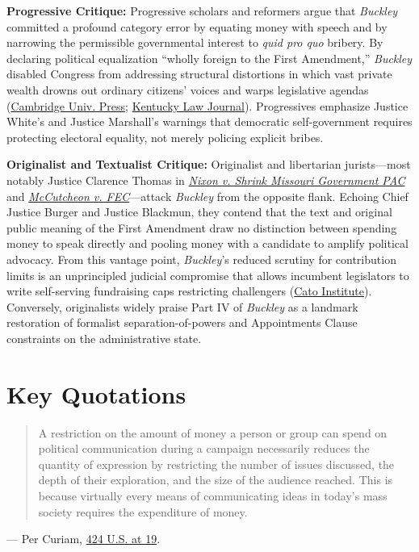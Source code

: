 \documentclass[12pt]{article}
\begin{document}
\textbf{Progressive Critique:} Progressive scholars and reformers argue that \textit{Buckley} committed a profound category error by equating money with speech and by narrowing the permissible governmental interest to \textit{quid pro quo} bribery. By declaring political equalization ``wholly foreign to the First Amendment,'' \textit{Buckley} disabled Congress from addressing structural distortions in which vast private wealth drowns out ordinary citizens' voices and warps legislative agendas (\href{https://www.cambridge.org/core/books/law-of-freedom/campaign-finance/67D70830F386B05225DCEF7D8D8C25C7}{Cambridge Univ. Press}; \href{https://uknowledge.uky.edu/cgi/viewcontent.cgi?article=5550&context=klj}{Kentucky Law Journal}). Progressives emphasize Justice White's and Justice Marshall's warnings that democratic self-government requires protecting electoral equality, not merely policing explicit bribes.

\textbf{Originalist and Textualist Critique:} Originalist and libertarian jurists---most notably Justice Clarence Thomas in \href{https://www.oyez.org/cases/1999/98-963}{\textit{Nixon v. Shrink Missouri Government PAC}} and \href{https://www.oyez.org/cases/2013/12-536}{\textit{McCutcheon v. FEC}}---attack \textit{Buckley} from the opposite flank. Echoing Chief Justice Burger and Justice Blackmun, they contend that the text and original public meaning of the First Amendment draw no distinction between spending money to speak directly and pooling money with a candidate to amplify political advocacy. From this vantage point, \textit{Buckley}'s reduced scrutiny for contribution limits is an unprincipled judicial compromise that allows incumbent legislators to write self-serving fundraising caps restricting challengers (\href{https://www.cato.org/commentary/buckley-v-valeo-not-what-ails-american-democracy}{Cato Institute}). Conversely, originalists widely praise Part IV of \textit{Buckley} as a landmark restoration of formalist separation-of-powers and Appointments Clause constraints on the administrative state.

\section{Key Quotations}

\begin{quote}
A restriction on the amount of money a person or group can spend on political communication during a campaign necessarily reduces the quantity of expression by restricting the number of issues discussed, the depth of their exploration, and the size of the audience reached. This is because virtually every means of communicating ideas in today's mass society requires the expenditure of money.
\end{quote}
\noindent --- Per Curiam, \href{https://supreme.justia.com/cases/federal/us/424/1/}{424 U.S. at 19}.
\end{document}
